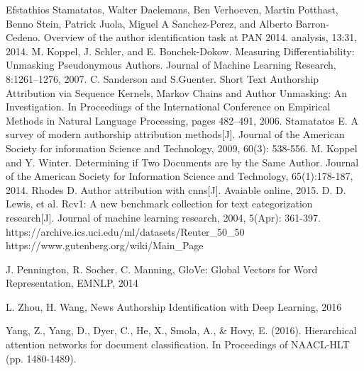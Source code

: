 \documentclass{article} %
\begin{document}
\newpage
\begin{thebibliography}{99}
Efstathios Stamatatos, Walter Daelemans, Ben Verhoeven, Martin Potthast, Benno Stein, Patrick Juola, Miguel A Sanchez-Perez, and Alberto Barron-Cedeno. Overview of the author identification task at PAN 2014. analysis, 13:31, 2014.
M. Koppel, J. Schler, and E. Bonchek-Dokow. Measuring Differentiability: Unmasking Pseudonymous Authors. Journal of Machine Learning Research, 8:1261–1276, 2007.
C. Sanderson and S.Guenter. Short Text Authorship Attribution via Sequence Kernels, Markov Chains and Author Unmasking: An Investigation. In Proceedings of the International Conference on Empirical Methods in Natural Language Processing, pages 482–491, 2006.
Stamatatos E. A survey of modern authorship attribution methods[J]. Journal of the American Society for information Science and Technology, 2009, 60(3): 538-556.
M. Koppel and Y. Winter. Determining if Two Documents are by the Same Author. Journal of the American Society for Information Science and Technology, 65(1):178-187, 2014.
Rhodes D. Author attribution with cnns[J]. Avaiable online, 2015.
D. D. Lewis, et al. Rcv1: A new benchmark collection for text categorization research[J]. Journal of machine learning research, 2004, 5(Apr): 361-397. 
 https://archive.ics.uci.edu/ml/datasets/Reuter\_50\_50
 https://www.gutenberg.org/wiki/Main\_Page

J. Pennington, R. Socher, C. Manning, GloVe: Global Vectors for Word Representation, EMNLP, 2014

L. Zhou, H. Wang, News Authorship Identification with Deep Learning, 2016

Yang, Z., Yang, D., Dyer, C., He, X., Smola, A., \& Hovy, E. (2016). Hierarchical attention networks for document classification. In Proceedings of NAACL-HLT (pp. 1480-1489).

\end{thebibliography}
\end{document}
